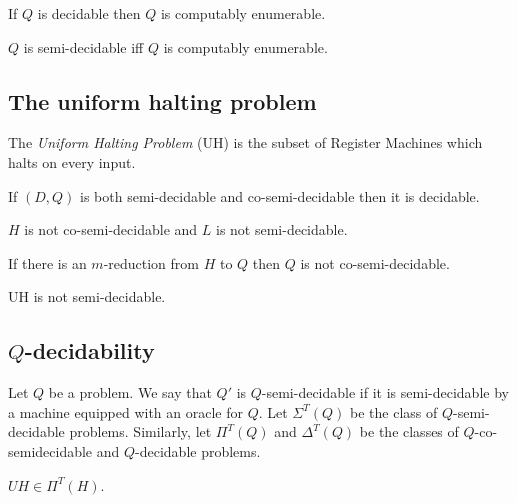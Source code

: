 \documentclass{article}
\begin{document}
\begin{theorem}[Notes I.25]
	If $Q$ is decidable then $Q$ is computably enumerable.
\end{theorem}

\begin{theorem}[Notes I.26, I.27]
	$Q$ is semi-decidable iff $Q$ is computably enumerable.
\end{theorem}

\subsection{The uniform halting problem}

\begin{definition}
	The \emph{Uniform Halting Problem} (UH) is the subset of Register Machines
	which halts on every input.
\end{definition}

\begin{theorem}[Notes I.28]
	If $(D,Q)$ is both semi-decidable and co-semi-decidable then it is decidable.
\end{theorem}

\begin{corollary}
	$H$ is not co-semi-decidable and $L$ is not semi-decidable.
\end{corollary}

\begin{corollary}
	If there is an $m$-reduction from $H$ to $Q$ then $Q$ is not co-semi-decidable.
\end{corollary}

\begin{theorem}[Notes I.31]
	UH is not semi-decidable.
\end{theorem}

\subsection{$Q$-decidability}

\begin{definition}
	Let $Q$ be a problem. We say that $Q'$ is $Q$-semi-decidable if it is semi-decidable
	by a machine equipped with an oracle for $Q$. Let $\Sigma^T(Q)$ be the class of
	$Q$-semi-decidable problems. Similarly, let $\Pi^T(Q)$ and $\Delta^T(Q)$ be the
	classes of $Q$-co-semidecidable and $Q$-decidable problems.
\end{definition}

\begin{theorem}
	$UH\in\Pi^T(H)$.
\end{theorem}
\end{document}
